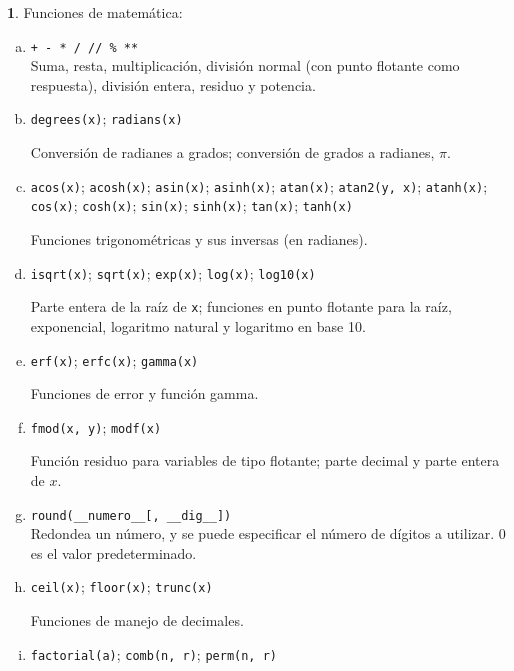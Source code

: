 \documentclass[12pt]{article}
\theoremstyle{definition}
\newtheorem{funcion}{}[section]
\begin{document}
\begin{funcion}
  Funciones de matem\'atica:
  \begin{enumerate}[a)]
    \item \verb|+ - * / // % **| \\[1ex]
  Suma, resta, multiplicaci\'on, divisi\'on normal (con punto flotante como respuesta), divisi\'on entera, residuo y potencia.

    \item \verb|degrees(x)|; \verb|radians(x)|

      Conversi\'on de radianes a grados; conversi\'on de grados a radianes, $\pi$.

\item \verb|acos(x)|;
      \verb|acosh(x)|;
      \verb|asin(x)|;
      \verb|asinh(x)|;
      \verb|atan(x)|;
      \verb|atan2(y, x)|;
      \verb|atanh(x)|;
      \verb|cos(x)|;
      \verb|cosh(x)|;
      \verb|sin(x)|;
      \verb|sinh(x)|;
      \verb|tan(x)|;
      \verb|tanh(x)|

      Funciones trigonom\'etricas y sus inversas (en radianes).

\item \verb|isqrt(x)|; \verb|sqrt(x)|; \verb|exp(x)|; \verb|log(x)|; \verb|log10(x)|

  Parte entera de la ra\'iz de \verb|x|; funciones en punto flotante para la ra\'iz, exponencial, logaritmo natural y logaritmo en base 10.

    \item \verb|erf(x)|; \verb|erfc(x)|; \verb|gamma(x)|

      Funciones de error y funci\'on gamma.

    \item \verb|fmod(x, y)|; \verb|modf(x)|
      
      Funci\'on residuo para variables de tipo flotante; parte decimal y parte entera de $x$.

\item \verb|round(__numero__[, __dig__])| \\[1ex]
  Redondea un n\'umero, y se puede especificar el n\'umero de d\'igitos a utilizar. 0 es el valor predeterminado.

    \item \verb|ceil(x)|;
      \verb|floor(x)|;
      \verb|trunc(x)|

      Funciones de manejo de decimales.

    \item \verb|factorial(a)|; \verb|comb(n, r)|; \verb|perm(n, r)|


\end{enumerate}
\end{funcion}
\end{document}
